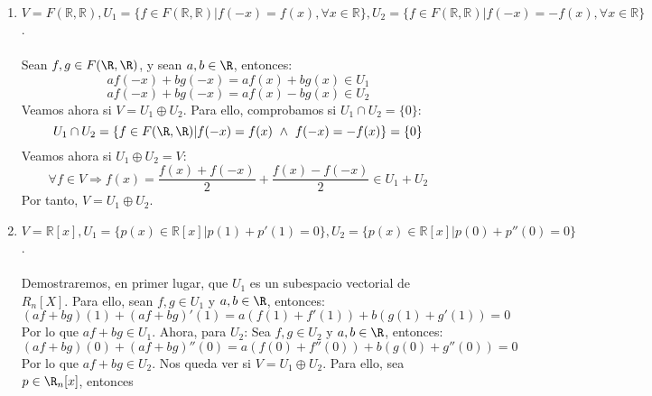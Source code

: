 \begin{ejercicio}
\begin{enumerate}
		\item \( V = F(\mathbb{R},\mathbb{R}), U_1 = \{f \in F(\mathbb{R},\mathbb{R}) | f(-x) = f(x), \forall x \in \mathbb{R}\}, U_2 = \{f \in F(\mathbb{R},\mathbb{R}) | f(-x) = -f(x), \forall x \in \mathbb{R}\} \).
		      \\ \\
		      Sean $f,g \in F(\R,\R)$, y sean $a,b \in \R$, entonces:
		      \begin{equation*}
			      a f(-x) + b g(-x) = a f(x) + b g(x) \in U_1
		      \end{equation*}
		      \begin{equation*}
			      a f(-x) + b g(-x) = a f(x) - b g(x) \in U_2
		      \end{equation*}
		      Veamos ahora si $V = U_1 \oplus U_2$. Para ello, comprobamos si $ U_1 \cap U_2 = \{0\} $:
		      \begin{equation*}
			      U_1 \cap U_2 = \{f \in F(\R,\R) | f(-x) = f(x) \ \land \ f(-x) = -f(x)\} = \{0\}
		      \end{equation*}
		      Veamos ahora si $U_1 \oplus U_2 = V$:
		      \begin{equation*}
			      \forall f \in V \Rightarrow f(x) = \frac{f(x) + f(-x)}{2} + \frac{f(x) - f(-x)}{2} \in U_1 + U_2
		      \end{equation*}
		      Por tanto, \( V = U_1 \oplus U_2 \).
		\item \( V = \mathbb{R}[x], U_1 = \{p(x) \in \mathbb{R}[x] | p(1) + p'(1) = 0\}, U_2 = \{p(x) \in \mathbb{R}[x] | p(0) + p''(0) = 0\} \).
              \\ \\ Demostraremos, en primer lugar, que $U_1$ es un subespacio vectorial de $R_n[X]$. Para ello, 
              sean $f, g \in U_1$ y $a,b \in \R$, entonces:
              \begin{equation*}
                (af +bg)(1) + (af + bg)'(1) = a(f(1) + f'(1)) + b(g(1) + g'(1)) = 0
              \end{equation*}
              Por lo que $af + bg \in U_1$. Ahora, para $U_2$:
              Sea $f,g \in U_2$ y $a,b \in \R$, entonces:
                \begin{equation*}
                    (af + bg)(0) + (af + bg)''(0) = a(f(0) + f''(0)) + b(g(0) + g''(0)) = 0
                \end{equation*}
                Por lo que $af + bg \in U_2$. 
                Nos queda ver si $V = U_1 \oplus U_2$. Para ello, sea $p \in \R_n[x]$, entonces
                \begin{align*}

\end{align*}
\end{enumerate}
\end{ejercicio}
